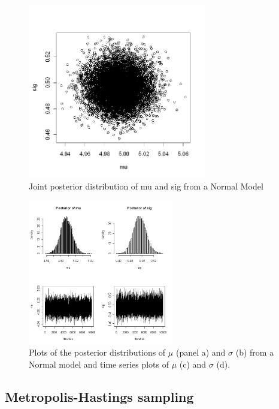\begin{figure}
\begin{center}
\includegraphics[height=3in]{Ch7/figs/postdist}
\end{center}
\caption{Joint posterior distribution of mu and sig from a Normal Model}
\label{postdist.fig}
\end{figure}

\begin{figure}
\begin{center}
\includegraphics[width=2.5in]{Ch7/figs/plotsofPD}
\end{center}
\caption{
Plots of the posterior distributions of $\mu$ (panel a) and
  $\sigma$ (b)
  from a Normal model and time series plots of $\mu$ (c) and $\sigma$ (d).}
\label{plotsofPD.fig}
\end{figure}

\subsection{ Metropolis-Hastings sampling   }

